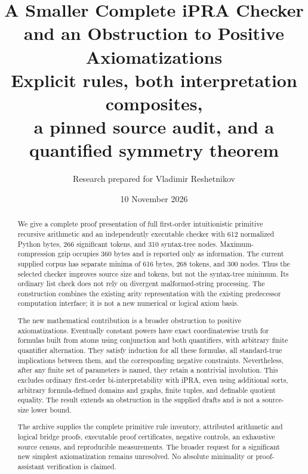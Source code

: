 \documentclass[11pt,letterpaper]{article}
\title{\color{ink}\bfseries A Smaller Complete iPRA Checker\\
and an Obstruction to Positive Axiomatizations\\[8pt]
\large Explicit rules, both interpretation composites,\\
a pinned source audit, and a quantified symmetry theorem}
\author{Research prepared for Vladimir Reshetnikov}
\date{10 November 2026}
\theoremstyle{definition}\newtheorem{definition}[theorem]{Definition}
\theoremstyle{remark}\newtheorem{remark}[theorem]{Remark}
\begin{document}
\maketitle
\begin{abstract}
We give a complete proof presentation of full first-order intuitionistic
primitive recursive arithmetic and an independently executable checker
with 612 normalized Python bytes, 266 significant tokens, and 310 syntax-tree
nodes. Maximum-compression gzip occupies 360 bytes and is reported only as
information. The current supplied corpus has separate minima of 616 bytes,
268 tokens, and 300 nodes. Thus the selected checker improves source size
and tokens, but not the syntax-tree minimum. Its ordinary list check does
not rely on divergent malformed-string processing. The construction
combines the existing arity representation with the existing predecessor
computation interface; it is not a new numerical or logical axiom basis.

The new mathematical contribution is a broader obstruction to positive
axiomatizations. Eventually constant powers have exact coordinatewise
truth for formulas built from atoms using conjunction and both quantifiers,
with arbitrary finite quantifier alternation. They satisfy induction for
all these formulas, all standard-true implications between them, and the
corresponding negative constraints. Nevertheless, after any finite set of
parameters is named, they retain a nontrivial involution. This excludes
ordinary first-order bi-interpretability with iPRA, even using additional
sorts, arbitrary formula-defined domains and graphs, finite tuples, and
definable quotient equality. The result extends an obstruction in the
supplied drafts and is not a source-size lower bound.

The archive supplies the complete primitive rule inventory, attributed
arithmetic and logical bridge proofs, executable proof certificates,
negative controls, an exhaustive source census, and reproducible measurements.
The broader request for a significant new simplest axiomatization remains
unresolved. No absolute minimality or proof-assistant verification is claimed.
\end{abstract}

\begin{center}
\end{center}
\clearpage
\setcounter{tocdepth}{1}\tableofcontents
\clearpage
\end{document}
